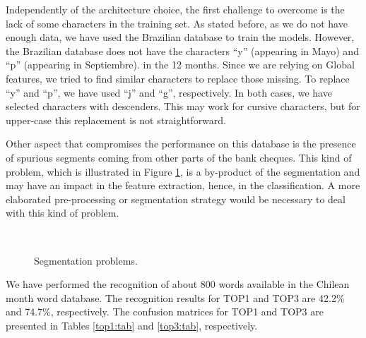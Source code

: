 \documentclass{article}[14pt, oneside, a4paper, times]
\begin{document}
Independently of the architecture choice, the first challenge to overcome is the lack of some characters in the training set. As stated before, as we do not have enough data, we have used the Brazilian database to train the models. However, the Brazilian database does not have the characters ``y'' (appearing in Mayo) and ``p'' (appearing in Septiembre). in the 12 months. Since we are relying on Global features, we tried to find similar characters to replace those missing. To replace ``y'' and ``p'', we have used ``j'' and ``g'', respectively. In both cases, we have selected characters with descenders. This may work for cursive characters, but for upper-case this replacement is not straightforward.  

Other aspect that compromises the performance on this database is the presence of spurious segments coming from other parts of the bank cheques. This kind of problem, which is illustrated in Figure \ref{spurious:fig}, is a by-product of the segmentation and may have an impact in the feature extraction, hence, in the classification. A more elaborated pre-processing or segmentation strategy would be necessary to deal with this kind of problem. 

 \begin {figure} [htb]
    \centering
    \mbox
        {
        \quad 
        }
         
    \caption{Segmentation problems.}
    \label{spurious:fig}
\end{figure}


We have performed the recognition of about 800 words available in the Chilean month word database. The recognition results for TOP1 and TOP3 are 42.2\% and 74.7\%, respectively. The confusion matrices for TOP1 and TOP3 are presented in Tables \ref{top1:tab} and \ref{top3:tab}, respectively. 
\end{document}
